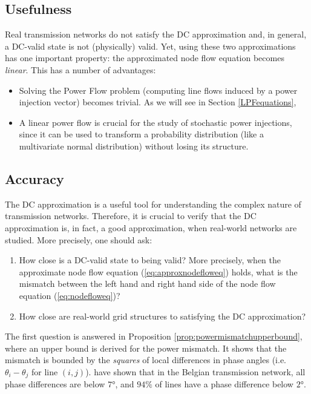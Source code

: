 \documentclass[main.tex]{subfiles}
\begin{document}
\subsection{Usefulness}
Real transmission networks do not satisfy the DC approximation and, in general, a DC-valid state is not (physically) valid. Yet, using these two approximations has one important property: the approximated node flow equation becomes \emph{linear}. This has a number of advantages:
\begin{itemize}
    \item Solving the Power Flow problem (\ie computing line flows induced by a power injection vector) becomes trivial. As we will see in Section \ref{LPFequations}, 
    \item A linear power flow is crucial for the study of stochastic power injections, since it can be used to transform a probability distribution (like a multivariate normal distribution) without losing its structure.
\end{itemize}
\subsection{Accuracy}
The DC approximation is a useful tool for understanding the complex nature of transmission networks. Therefore, it is crucial to verify that the DC approximation is, in fact, a good approximation, when real-world networks are studied. More precisely, one should ask:
\begin{enumerate}
    \item How close is a DC-valid state to being valid? More precisely, when the approximate node flow equation (\ref{eq:approxnodefloweq}) holds, what is the mismatch between the left hand and right hand side of the node flow equation (\ref{eq:nodefloweq})?
    \item How close are real-world grid structures to satisfying the DC approximation?
\end{enumerate}

The first question is answered in Proposition \ref{prop:powermismatchupperbound}, where an upper bound is derived for the power mismatch. It shows that the mismatch is bounded by the \emph{squares} of local differences in phase angles (i.e. $\theta_i - \theta_j$ for line $(i,j)$). \citet{Purchala} have shown that in the Belgian transmission network, all phase differences are below $7 \si{\degree}$, and $94\si{\percent}$ of lines have a phase difference below $2\si{\degree}$. 
\end{document}

